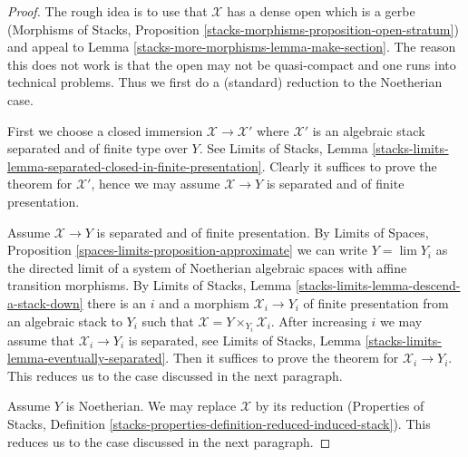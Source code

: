 \begin{proof}
The rough idea is to use that $\mathcal{X}$ has a dense open
which is a gerbe (Morphisms of Stacks, Proposition
\ref{stacks-morphisms-proposition-open-stratum})
and appeal to Lemma \ref{stacks-more-morphisms-lemma-make-section}.
The reason this does not work is that the open may not be
quasi-compact and one runs into technical problems. Thus
we first do a (standard) reduction to the Noetherian case.

\medskip\noindent
First we choose a closed immersion
$\mathcal{X} \to \mathcal{X}'$ where $\mathcal{X}'$
is an algebraic stack separated and of finite type over $Y$.
See Limits of Stacks, Lemma
\ref{stacks-limits-lemma-separated-closed-in-finite-presentation}.
Clearly it suffices to prove the theorem for
$\mathcal{X}'$, hence we may assume $\mathcal{X} \to Y$
is separated and of finite presentation.

\medskip\noindent
Assume $\mathcal{X} \to Y$ is separated and of finite presentation.
By Limits of Spaces, Proposition \ref{spaces-limits-proposition-approximate}
we can write $Y = \lim Y_i$ as the directed limit of a system
of Noetherian algebraic spaces with affine transition morphisms.
By Limits of Stacks, Lemma \ref{stacks-limits-lemma-descend-a-stack-down}
there is an $i$ and a morphism $\mathcal{X}_i \to Y_i$ of finite presentation
from an algebraic stack to $Y_i$ such that
$\mathcal{X} = Y \times_{Y_i} \mathcal{X}_i$.
After increasing $i$ we may assume that $\mathcal{X}_i \to Y_i$
is separated, see Limits of Stacks, Lemma
\ref{stacks-limits-lemma-eventually-separated}.
Then it suffices to prove the theorem
for $\mathcal{X}_i \to Y_i$. This reduces us to the case discussed
in the next paragraph.

\medskip\noindent
Assume $Y$ is Noetherian. We may replace $\mathcal{X}$ by its
reduction (Properties of Stacks, Definition
\ref{stacks-properties-definition-reduced-induced-stack}).
This reduces us to the case discussed
in the next paragraph.


\end{proof}
